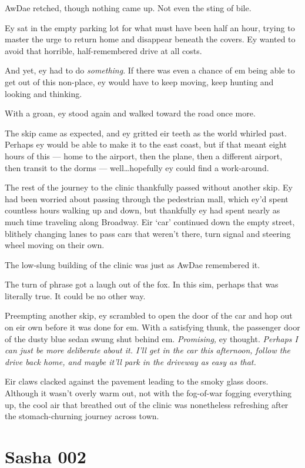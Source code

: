 AwDae retched, though nothing came up. Not even the sting of bile.

Ey sat in the empty parking lot for what must have been half an hour, trying to master the urge to return home and disappear beneath the covers. Ey wanted to avoid that horrible, half-remembered drive at all costs.

And yet, ey had to do \emph{something}. If there was even a chance of em being able to get out of this non-place, ey would have to keep moving, keep hunting and looking and thinking.

With a groan, ey stood again and walked toward the road once more.

The skip came as expected, and ey gritted eir teeth as the world whirled past. Perhaps ey would be able to make it to the east coast, but if that meant eight hours of this --- home to the airport, then the plane, then a different airport, then transit to the dorms --- well\ldots{}hopefully ey could find a work-around.

The rest of the journey to the clinic thankfully passed without another skip. Ey had been worried about passing through the pedestrian mall, which ey'd spent countless hours walking up and down, but thankfully ey had spent nearly as much time traveling along Broadway. Eir `car' continued down the empty street, blithely changing lanes to pass cars that weren't there, turn signal and steering wheel moving on their own.

The low-slung building of the clinic was just as AwDae remembered it.

The turn of phrase got a laugh out of the fox. In this sim, perhaps that was literally true. It could be no other way.

Preempting another skip, ey scrambled to open the door of the car and hop out on eir own before it was done for em. With a satisfying thunk, the passenger door of the dusty blue sedan swung shut behind em. \emph{Promising,} ey thought. \emph{Perhaps I can just be more deliberate about it. I'll get in the car this afternoon, follow the drive back home, and maybe it'll park in the driveway as easy as that.}

Eir claws clacked against the pavement leading to the smoky glass doors. Although it wasn't overly warm out, not with the fog-of-war fogging everything up, the cool air that breathed out of the clinic was nonetheless refreshing after the stomach-churning journey across town.

\chapter*{Sasha 002}

